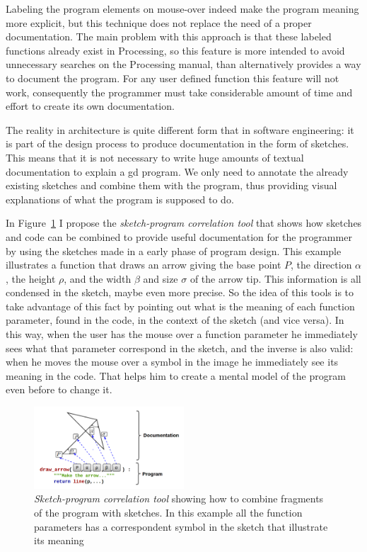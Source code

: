 Labeling the program elements on mouse-over indeed make the program meaning more explicit, but this technique does not replace the need of a proper documentation. The main problem with this approach is that these labeled functions already exist in Processing, so this feature is more intended to avoid unnecessary searches on the Processing manual, than alternatively provides a way to document the program. For any user defined function this feature will not work, consequently the programmer must take considerable amount of time and effort to create its own documentation.

The reality in architecture is quite different form that in software engineering: it is part of the design process to produce documentation in the form of sketches. This means that it is not necessary to write huge amounts of textual documentation to explain a \gls{gd} program. We only need to annotate the already existing sketches and combine them with the program, thus providing visual explanations of what the program is supposed to do.

In Figure~\ref{fig:sc-tool} I propose the \textit{sketch-program correlation tool} that shows how sketches and code can be combined to provide useful documentation for the programmer by using the sketches made in a early phase of program design. This example illustrates a function that draws an arrow giving the base point $P$, the direction $\alpha$, the height $\rho$, and the width $\beta$ and size $\sigma$ of the arrow tip. This information is all condensed in the sketch, maybe even more precise. So the idea of this tools is to take advantage of this fact by pointing out what is the meaning of each function parameter, found in the code, in the context of the sketch (and vice versa). In this way, when the user has the mouse over a function parameter he immediately sees what that parameter correspond in the sketch, and  the inverse is also valid: when he moves the mouse over a symbol in the image he immediately see its meaning in the code. That helps him to create a mental model of the program even before to change it.

\begin{figure}[!htbp]
  \centering
  \includegraphics[width=0.5\textwidth]{images/proposed-sc-tool}
    \caption{\textit{Sketch-program correlation tool} showing how to combine fragments of the program with sketches. In this example all the function parameters has a correspondent symbol in the sketch that illustrate its meaning}
  \label{fig:sc-tool}
\end{figure}

